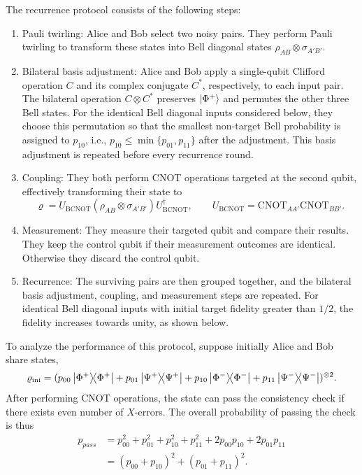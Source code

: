 \documentclass[onecolumn,prx,longbibliography,nofootinbib, superscriptaddress]{revtex4-2}
\theoremstyle{recap}
\begin{document}
The recurrence protocol consists of the following steps:
\begin{enumerate}
    \item Pauli twirling: Alice and Bob select two noisy pairs. They perform Pauli twirling to transform these states into Bell diagonal states $\rho_{AB}\otimes\sigma_{A'B'}$.
    \item Bilateral basis adjustment: Alice and Bob apply a single-qubit Clifford operation $C$ and its complex conjugate $C^*$, respectively, to each input pair. The bilateral operation $C\otimes C^*$ preserves $\ket{\Phi^+}$ and permutes the other three Bell states. For the identical Bell diagonal inputs considered below, they choose this permutation so that the smallest non-target Bell probability is assigned to $p_{10}$, i.e., $p_{10}\leq\min\{p_{01},p_{11}\}$ after the adjustment. This basis adjustment is repeated before every recurrence round.
    \item Coupling: They both perform CNOT operations targeted at the second qubit, effectively transforming their state to
    \begin{equation}
        \varrho=U_{\mathrm{BCNOT}}(\rho_{AB}\otimes \sigma_{A'B'})U_{\mathrm{BCNOT}}^{\dagger},\qquad U_{\mathrm{BCNOT}}=\mathrm{CNOT}_{AA'}\mathrm{CNOT}_{BB'}.
    \end{equation}
    \item Measurement: They measure their targeted qubit and compare their results. They keep the control qubit if their measurement outcomes are identical. Otherwise they discard the control qubit.
    \item Recurrence: The surviving pairs are then grouped together, and the bilateral basis adjustment, coupling, and measurement steps are repeated. For identical Bell diagonal inputs with initial target fidelity greater than $1/2$, the fidelity increases towards unity, as shown below.
\end{enumerate}
To analyze the performance of this protocol, suppose initially Alice and Bob share states,
\begin{equation}
    \varrho_{\mathrm{ini}}=(p_{00}\ketbra{\Phi^+}{\Phi^+}+p_{01}\ketbra{\Psi^+}{\Psi^+}+p_{10}\ketbra{\Phi^-}{\Phi^-}+p_{11}\ketbra{\Psi^-}{\Psi^-})^{\otimes 2}.
\end{equation}
After performing CNOT operations, the state can pass the consistency check if there exists even number of $X$-errors. The overall probability of passing the check is thus
\begin{equation}
\begin{split}
    p_{pass}&=p_{00}^2+p_{01}^2+p_{10}^2+p_{11}^2+2p_{00}p_{10}+2p_{01}p_{11}\\
    &=(p_{00}+p_{10})^2+(p_{01}+p_{11})^2.
\end{split}
\end{equation}
\end{document}
